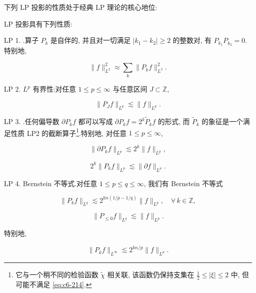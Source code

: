 下列 LP 投影的性质处于经典 LP 理论的核心地位:

\begin{theorem}\label{thm:c6-3.1}
LP 投影具有下列性质:

LP 1. .算子 $P_k$ 是自伴的, 并且对一切满足 $|k_1 - k_2| \geq 2$ 的整数对, 有 $P_{k_1} P_{k_2} = 0$.特别地,

\begin{equation}
\|f\|_{L^2}^2 \approx \sum_k \|P_k f\|_{L^2}^2.\label{eq:c6-219}
\end{equation}

LP 2. $L^p$ 有界性:对任意 $1 \leq p \leq \infty$ 与任意区间 $J \subset \mathbb{Z}$,

\begin{equation}
\|P_J f\|_{L^p} \lesssim \|f\|_{L^p}.\label{eq:c6-220}
\end{equation}

LP 3. .任何偏导数 $\partial P_k f$ 都可以写成 $\partial P_k f = 2^k \tilde{P}_k f$ 的形式, 而 $\tilde{P}_k$ 的象征是一个满足性质 LP2 的截断算子\footnote{它与一个稍不同的检验函数 $\tilde{\chi}$ 相关联, 该函数仍保持支集在 $\frac{1}{2} \leq |\xi| \leq 2$ 中, 但可能不满足 \eqref{eq:c6-214}.}.特别地, 对任意 $1 \leq p \leq \infty$,

\begin{equation}
\|\partial P_k f\|_{L^p} \lesssim 2^k \|f\|_{L^p}, \label{eq:c6-221}
\end{equation}

\begin{equation}
2^k \|P_k f\|_{L^p} \lesssim \|\partial f\|_{L^p}.\label{eq:c6-222}
\end{equation}

LP 4. Bernstein 不等式.对任意 $1 \leq p \leq q \leq \infty$, 我们有 Bernstein 不等式

\begin{equation}
\|P_k f\|_{L^q} \lesssim 2^{kn(1/p-1/q)} \|f\|_{L^p}, \quad \forall\, k\in\mathbb{Z}, \label{eq:c6-223}
\end{equation}

\begin{equation}
\|P_{\leq 0} f\|_{L^q} \lesssim \|f\|_{L^p}.\label{eq:c6-224}
\end{equation}

特别地,

\[
\|P_k f\|_{L^\infty} \lesssim 2^{kn/p} \|f\|_{L^p}.
\]


\end{theorem}
